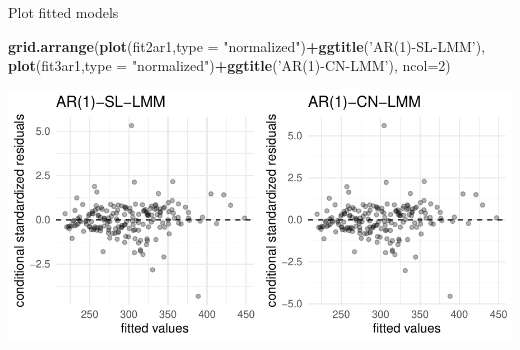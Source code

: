 \documentclass[
  ignorenonframetext,
]{beamer}
\newenvironment{Shaded}{\begin{snugshade}}{\end{snugshade}}
\newcommand{\DataTypeTok}[1]{\textcolor[rgb]{0.13,0.29,0.53}{#1}}
\newcommand{\DecValTok}[1]{\textcolor[rgb]{0.00,0.00,0.81}{#1}}
\newcommand{\KeywordTok}[1]{\textcolor[rgb]{0.13,0.29,0.53}{\textbf{#1}}}
\newcommand{\NormalTok}[1]{#1}
\newcommand{\OperatorTok}[1]{\textcolor[rgb]{0.81,0.36,0.00}{\textbf{#1}}}
\newcommand{\StringTok}[1]{\textcolor[rgb]{0.31,0.60,0.02}{#1}}
\begin{document}
\begin{frame}[fragile]{Plot fitted models}
\protect\hypertarget{plot-fitted-models}{}

\scriptsize

\begin{Shaded}
\begin{Highlighting}[]
\KeywordTok{grid.arrange}\NormalTok{(}\KeywordTok{plot}\NormalTok{(fit2ar1,}\DataTypeTok{type =} \StringTok{"normalized"}\NormalTok{)}\OperatorTok{+}\KeywordTok{ggtitle}\NormalTok{(}\StringTok{'AR(1)-SL-LMM'}\NormalTok{),}
             \KeywordTok{plot}\NormalTok{(fit3ar1,}\DataTypeTok{type =} \StringTok{"normalized"}\NormalTok{)}\OperatorTok{+}\KeywordTok{ggtitle}\NormalTok{(}\StringTok{'AR(1)-CN-LMM'}\NormalTok{),}
             \DataTypeTok{ncol=}\DecValTok{2}\NormalTok{)}
\end{Highlighting}
\end{Shaded}

\begin{center}\includegraphics[width=0.85\linewidth]{codes_files/figure-beamer/extra1-1} \end{center}

\end{frame}
\end{document}
